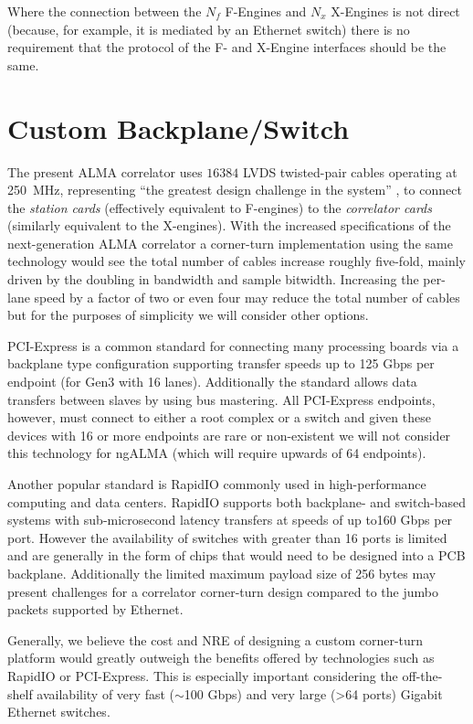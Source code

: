 \documentclass{article}
\begin{document}
Where the connection between the $N_f$ F-Engines and $N_x$ X-Engines is not direct (because, for example, it is mediated by an Ethernet switch) there is no requirement that the protocol of the F- and X-Engine interfaces should be the same.

\section{Custom Backplane/Switch}
The present ALMA correlator uses $16384$ LVDS twisted-pair cables operating at 250~MHz, representing ``the greatest design challenge in the system'' \cite{Escoffier2007}, to connect the \emph{station cards} (effectively equivalent to F-engines) to the \emph{correlator cards} (similarly equivalent to the X-engines). With the increased specifications of the next-generation ALMA correlator a corner-turn implementation using the same technology would see the total number of cables increase roughly five-fold, mainly driven by the doubling in bandwidth and sample bitwidth. Increasing the per-lane speed by a factor of two or even four may reduce the total number of cables but for the purposes of simplicity we will consider other options.

PCI-Express is a common standard for connecting many processing boards via a backplane type configuration supporting transfer speeds up to 125 Gbps per endpoint (for Gen3 with 16 lanes). Additionally the standard allows data transfers between slaves by using bus mastering. All PCI-Express endpoints, however, must connect to either a root complex or a switch and given these devices with 16 or more endpoints are rare or non-existent we will not consider this technology for ngALMA (which will require upwards of 64 endpoints).

Another popular standard is RapidIO commonly used in high-performance computing and data centers. RapidIO supports both backplane- and switch-based systems with sub-microsecond latency transfers at speeds of up to160 Gbps per port. However the availability of switches with greater than 16 ports is limited and are generally in the form of chips that would need to be designed into a PCB backplane. Additionally the limited maximum payload size of 256 bytes may present challenges for a correlator corner-turn design compared to the jumbo packets supported by Ethernet.

Generally, we believe the cost and NRE of designing a custom corner-turn platform would greatly outweigh the benefits offered by technologies such as RapidIO or PCI-Express. This is especially important considering the off-the-shelf availability of very fast ($\sim$100 Gbps) and very large (\textgreater 64 ports) Gigabit Ethernet switches.
\end{document}
